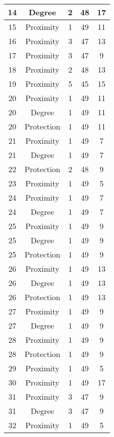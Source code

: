\documentclass[results.tex]{subfiles}
\begin{document}
\begin{center}
\begin{tabular}{| c || c | c | c | c |}
    \hline
    14 & Degree & 2 & 48 & 17 \\ 
    \hline
    15 & Proximity & 1 & 49 & 11 \\ 
    \hline
    16 & Proximity & 3 & 47 & 13 \\ 
    \hline
    17 & Proximity & 3 & 47 & 9 \\ 
    \hline
    18 & Proximity & 2 & 48 & 13 \\ 
    \hline
    19 & Proximity & 5 & 45 & 15 \\ 
    \hline
    20 & Proximity & 1 & 49 & 11 \\ 
    \hline
    20 & Degree & 1 & 49 & 11 \\ 
    \hline
    20 & Protection & 1 & 49 & 11 \\ 
    \hline
    21 & Proximity & 1 & 49 & 7 \\ 
    \hline
    21 & Degree & 1 & 49 & 7 \\ 
    \hline
    22 & Protection & 2 & 48 & 9 \\ 
    \hline
    23 & Proximity & 1 & 49 & 5 \\ 
    \hline
    24 & Proximity & 1 & 49 & 7 \\ 
    \hline
    24 & Degree & 1 & 49 & 7 \\ 
    \hline
    25 & Proximity & 1 & 49 & 9 \\ 
    \hline
    25 & Degree & 1 & 49 & 9 \\ 
    \hline
    25 & Protection & 1 & 49 & 9 \\ 
    \hline
    26 & Proximity & 1 & 49 & 13 \\ 
    \hline
    26 & Degree & 1 & 49 & 13 \\ 
    \hline
    26 & Protection & 1 & 49 & 13 \\ 
    \hline
    27 & Proximity & 1 & 49 & 9 \\ 
    \hline
    27 & Degree & 1 & 49 & 9 \\ 
    \hline
    28 & Proximity & 1 & 49 & 9 \\ 
    \hline
    28 & Protection & 1 & 49 & 9 \\ 
    \hline
    29 & Proximity & 1 & 49 & 5 \\ 
    \hline
    30 & Proximity & 1 & 49 & 17 \\ 
    \hline
    31 & Proximity & 3 & 47 & 9 \\ 
    \hline
    31 & Degree & 3 & 47 & 9 \\ 
    \hline
    32 & Proximity & 1 & 49 & 5 \\ 

\end{tabular}
\end{center}
\end{document}
